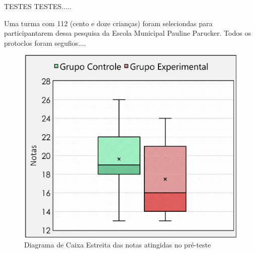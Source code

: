 


TESTES TESTES.....

Uma turma com 112 (cento e doze crianças) foram seleciondas para participantarem dessa pesquisa da Escola Municipal Pauline Parucker. Todos os protoclos foram segufios....


\begin{figure}[htb]

    \caption{\label{fig:caixapre}Diagrama de Caixa Estreita das notas atingidas no pré-teste}
    \includegraphics[width=\linewidth]{./Visuais/CaixaEstreitaEnfeitado.pdf}
  
\end{figure}



